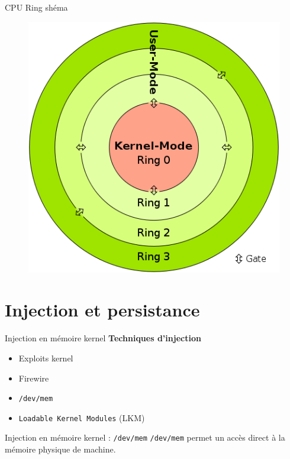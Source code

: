 \documentclass[10pt]{beamer}
\begin{document}
		\begin{frame}{CPU Ring shéma}

    		\begin{figure}
				\begin{center}
					\includegraphics[scale=0.4]{ring.png}
				\end{center}
  		  	\end{figure}	
			
		\end{frame}		

\section{Injection et persistance}

	\begin{frame}{Injection en mémoire kernel}
		\textbf{Techniques d'injection}
		\begin{itemize}
			\item Exploits kernel
			\item Firewire
			\item\texttt{/dev/mem}
			\item \texttt{Loadable Kernel Modules} (LKM)
		\end{itemize}
	\end{frame}

	\begin{frame}{Injection en mémoire kernel : \texttt{/dev/mem}}
		\texttt{/dev/mem} permet un accès direct à la mémoire physique de machine.
	\end{frame}
\end{document}
